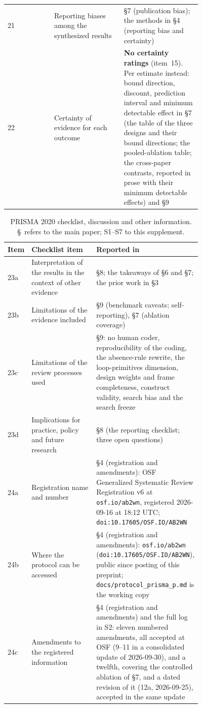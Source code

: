 \begin{table}[htbp]
\begin{tabular}{@{}l p{0.36\linewidth} p{0.40\linewidth}@{}}
21 & \raggedright Reporting biases among the synthesized results & \raggedright \S7 (publication bias); the methods in \S4 (reporting bias and certainty) \tabularnewline
22 & \raggedright Certainty of evidence for each outcome & \raggedright \textbf{No certainty ratings} (item~15). Per estimate instead: bound direction, discount, prediction interval and minimum detectable effect in \S7 (the table of the three designs and their bound directions; the pooled-ablation table; the cross-paper contrasts, reported in prose with their minimum detectable effects) and \S9 \tabularnewline
\bottomrule
\end{tabular}
\end{table}

\begin{table}[htbp]
\caption{PRISMA 2020 checklist, discussion and other information. \S\ refers to the main paper;
S1--S7 to this supplement.}
\label{tab:prisma-discussion}
\footnotesize
\begin{tabular}{@{}l p{0.36\linewidth} p{0.40\linewidth}@{}}
\toprule
Item & Checklist item & Reported in \\
\midrule
23a & \raggedright Interpretation of the results in the context of other evidence & \raggedright \S8; the takeaways of \S6 and \S7; the prior work in \S3 \tabularnewline
23b & \raggedright Limitations of the evidence included & \raggedright \S9 (benchmark caveats; self-reporting), \S7 (ablation coverage) \tabularnewline
23c & \raggedright Limitations of the review processes used & \raggedright \S9: no human coder, reproducibility of the coding, the absence-rule rewrite, the loop-primitives dimension, design weights and frame completeness, construct validity, search bias and the search freeze \tabularnewline
23d & \raggedright Implications for practice, policy and future research & \raggedright \S8 (the reporting checklist; three open questions) \tabularnewline
24a & \raggedright Registration name and number & \raggedright \S4 (registration and amendments): OSF Generalized Systematic Review Registration v6 at \texttt{osf.io/ab2wn}, registered 2026-09-16 at 18:12 UTC; \texttt{doi:10.17605/OSF.IO/AB2WN} \tabularnewline
24b & \raggedright Where the protocol can be accessed & \raggedright \S4 (registration and amendments): \texttt{osf.io/ab2wn} (\texttt{doi:10.17605/OSF.IO/AB2WN}), public since posting of this preprint; \texttt{docs/protocol\_prisma\_p.md} is the working copy \tabularnewline
24c & \raggedright Amendments to the registered information & \raggedright \S4 (registration and amendments) and the full log in S2: eleven numbered amendments, all accepted at OSF (9--11 in a consolidated update of 2026-09-30), and a twelfth, covering the controlled ablation of \S7, and a dated revision of it (12a, 2026-09-25), accepted in the same update \tabularnewline

\end{tabular}
\end{table}
